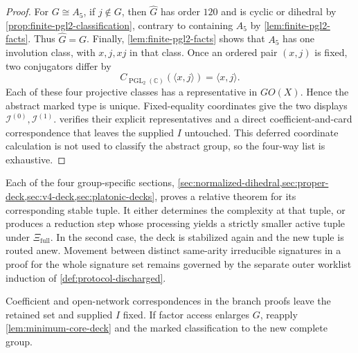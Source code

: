 \documentclass[11pt,letterpaper,onecolumn]{article}
\theoremstyle{plain}
\theoremstyle{definition}
\theoremstyle{remark}
\newcommand{\IcoZero}{{\mathcal I^{(0)}}}
\newcommand{\IcoOne}{{\mathcal I^{(1)}}}
\newcommand{\PGL}{\operatorname{PGL}}
\begin{document}
\begin{proof}
For \(G\cong A_5\), if \(j\notin G\), then \(\widehat G\) has order \(120\)
and is cyclic or dihedral by \cref{prop:finite-pgl2-classification},
contrary to containing \(A_5\) by \cref{lem:finite-pgl2-facts}.
Thus \(\widehat G=G\). Finally, \cref{lem:finite-pgl2-facts} shows that \(A_5\) has one
involution class, with \(x,j,xj\) in that class.  Once an ordered pair
\((x,j)\) is fixed, two conjugators differ by
\[
 C_{\PGL_2(\mathbb C)}(\langle x,j\rangle)=\langle x,j\rangle.
\]
Each of these four projective classes has a representative in \(GO(X)\).
  Hence the abstract marked type is unique.  Fixed-equality coordinates give
  the two displays \(\IcoZero,\IcoOne\).  verifies their
  explicit representatives and a direct coefficient-and-card correspondence
  that leaves the supplied \(I\) untouched.  This deferred coordinate calculation is not used
to classify the abstract group, so the four-way list is exhaustive.
\end{proof}

Each of the four group-specific sections,
\cref{sec:normalized-dihedral,sec:proper-deck,sec:v4-deck,sec:platonic-decks},
proves a relative theorem for its corresponding stable tuple.  It either
determines the complexity at that tuple, or
produces a reduction step whose processing yields a strictly smaller
active tuple under \(\Xi_{\mathrm{full}}\).  In the second case, the deck is stabilized
again and the new tuple is routed anew.  Movement between distinct
same-arity irreducible signatures in a proof for the whole signature set remains governed by the
separate outer worklist induction of \cref{def:protocol-discharged}.

Coefficient and open-network correspondences in the branch proofs
leave the retained set and supplied \(I\) fixed. If factor access
enlarges \(G\), reapply \cref{lem:minimum-core-deck} and the marked
classification to the new complete group.
\end{document}
